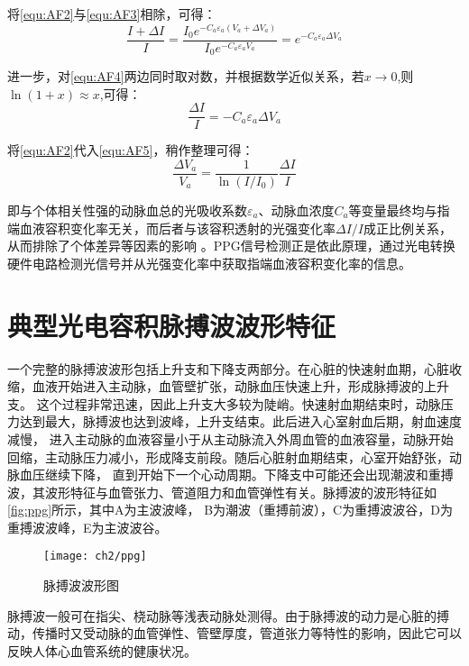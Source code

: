 将\autoref{equ:AF2}与\autoref{equ:AF3}相除，可得：
\begin{equation}
    \label{equ:AF4}
    \frac{I+\Delta I}{I}=\frac{I_{0}e^{-C_{a}\varepsilon _{a}(V_{a}+\Delta V_{a})}}{I_{0}e^{-C_{a}\varepsilon _{a}V_{a}}}=e^{-C_{a}\varepsilon _{a}\Delta V_{a}} 
\end{equation}

进一步，对\autoref{equ:AF4}两边同时取对数，并根据数学近似关系，若$x\rightarrow 0$,则$\ln(1+x)\approx x$,可得：
\begin{equation}
    \label{equ:AF5}
    \frac{\Delta I}{I}=-C_{a}\varepsilon _{a}\Delta V_{a}
\end{equation}

将\autoref{equ:AF2}代入\autoref{equ:AF5}，稍作整理可得：
\begin{equation}
    \label{equ:AF6}
    \frac{\Delta V_{a}}{V_{a}}=\frac{1}{\ln(I/I_{0})}\frac{\Delta I}{I}
\end{equation}

即与个体相关性强的动脉血总的光吸收系数$\varepsilon _{a}$、动脉血浓度$C_{a}$等变量最终均与指端血液容积变化率无关，而后者与该容积透射的光强变化率$\Delta I/I$成正比例关系，从而排除了个体差异等因素的影响
\cite{1980Spectrophotometric,4122392,PPGYY}。PPG信号检测正是依此原理，通过光电转换硬件电路检测光信号并从光强变化率中获取指端血液容积变化率的信息。
\section{典型光电容积脉搏波波形特征}
一个完整的脉搏波波形包括上升支和下降支两部分。在心脏的快速射血期，心脏收缩，血液开始进入主动脉，血管壁扩张，动脉血压快速上升，形成脉搏波的上升支。
这个过程非常迅速，因此上升支大多较为陡峭。快速射血期结束时，动脉压力达到最大，脉搏波也达到波峰，上升支结束。此后进入心室射血后期，射血速度减慢，
进入主动脉的血液容量小于从主动脉流入外周血管的血液容量，动脉开始回缩，主动脉压力减小，形成降支前段。随后心脏射血期结束，心室开始舒张，动脉血压继续下降，
直到开始下一个心动周期。下降支中可能还会出现潮波和重搏波，其波形特征与血管张力、管道阻力和血管弹性有关。脉搏波的波形特征如\autoref{fig:ppg}所示，其中A为主波波峰，
B为潮波（重搏前波），C为重搏波波谷，D为重搏波波峰，E为主波波谷。
\begin{figure}[htbp]
\centering
\texttt{[image: ch2/ppg]}
\caption{\label{fig:ppg}脉搏波波形图}
\end{figure}
脉搏波一般可在指尖、桡动脉等浅表动脉处测得。由于脉搏波的动力是心脏的搏动，传播时又受动脉的血管弹性、管壁厚度，管道张力等特性的影响，因此它可以反映人体心血管系统的健康状况。
